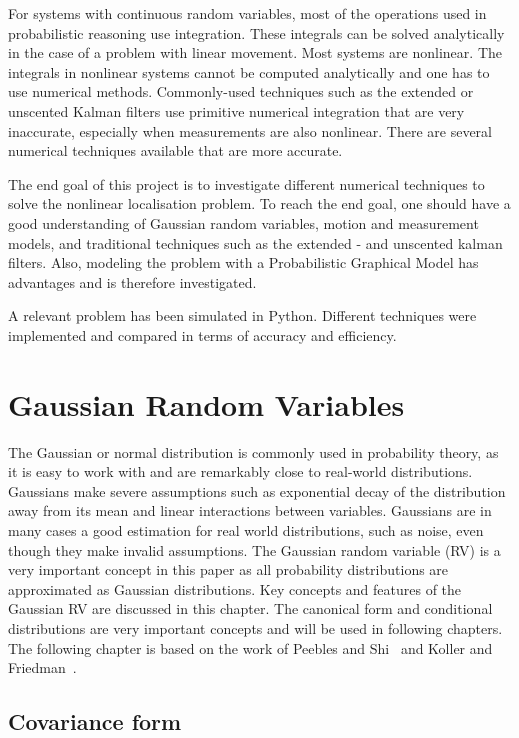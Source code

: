 \documentclass[12pt,oneside,openany,a4paper, %
afrikaans,english,
]{memoir}
\numberwithin{equation}{chapter}
\begin{document}
For systems with continuous random variables, most of the operations used in probabilistic reasoning use integration. These integrals can be solved analytically in the case of a problem with linear movement. Most systems are nonlinear. The integrals in nonlinear systems cannot be computed analytically and one has to use numerical methods. Commonly-used techniques such as the extended or unscented Kalman filters use primitive numerical integration that are very inaccurate, especially when measurements are also nonlinear. There are several numerical techniques available that are more accurate.

The end goal of this project is to investigate different numerical techniques to solve the nonlinear localisation problem. To reach the end goal, one should have a good understanding of Gaussian random variables, motion and measurement models, and traditional techniques such as the extended - and unscented kalman filters. Also, modeling the problem with a Probabilistic Graphical Model has advantages and is therefore investigated. 

A relevant problem has been simulated in Python. Different techniques were implemented and compared in terms of accuracy and efficiency.

\setcounter{secnumdepth}{2}
\chapter{Gaussian Random Variables}
The Gaussian or normal distribution is commonly used in probability theory, as it is easy to work with and are remarkably close to real-world distributions. Gaussians make severe assumptions such as exponential decay of the distribution away from its mean and linear interactions between variables. Gaussians are in many cases a good estimation for real world distributions, such as noise, even though they make invalid assumptions. The Gaussian random variable (RV) is a very important concept in this paper as all probability distributions are approximated as Gaussian distributions. Key concepts and features of the Gaussian RV are discussed in this chapter. The canonical form and conditional distributions are very important concepts and will be used in following chapters. The following chapter is based on the work of Peebles and Shi~\cite{peebles} and Koller and Friedman~\cite{koller}.

\section{Covariance form}
\end{document}

